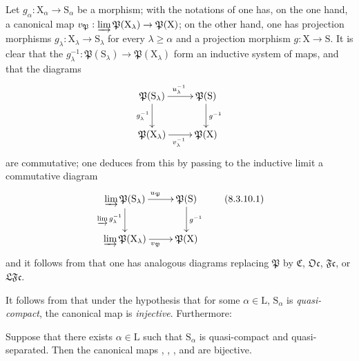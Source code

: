 \begin{env}[8.3.10]
\label{IV.8.3.10}
Let $g_\alpha:\mathrm{X}_\alpha\to\mathrm{S}_\alpha$ be a morphism; with the notations of  one has, on the one hand, a canonical map $v_\mathfrak{P}:\varinjlim\mathfrak{P}(\mathrm{X}_\lambda)\to\mathfrak{P}(\mathrm{X})$; on the other hand, one has projection morphisms $g_\lambda:\mathrm{X}_\lambda\to\mathrm{S}_\lambda$ for every $\lambda\geqslant\alpha$ and a projection morphism $g:\mathrm{X}\to\mathrm{S}$.
It is clear that the $g_\lambda^{-1}:\mathfrak{P}(\mathrm{S}_\lambda)\to\mathfrak{P}(\mathrm{X}_\lambda)$ form an inductive system of maps, and that the diagrams
\[
\xymatrix{
  \mathfrak{P}(\mathrm{S}_\lambda) \ar[r]^{u_\lambda^{-1}} \ar[d]_{g_\lambda^{-1}} & \mathfrak{P}(\mathrm{S}) \ar[d]^{g^{-1}} \\
  \mathfrak{P}(\mathrm{X}_\lambda) \ar[r]_{v_\lambda^{-1}} & \mathfrak{P}(\mathrm{X})
}
\]
are commutative; one deduces from this by passing to the inductive limit a commutative diagram
\begin{equation}
\xymatrix{
  \varinjlim\mathfrak{P}(\mathrm{S}_\lambda) \ar[r]^{u_\mathfrak{P}} \ar[d]_{\varinjlim g_\lambda^{-1}} & \mathfrak{P}(\mathrm{S}) \ar[d]^{g^{-1}} \\
  \varinjlim\mathfrak{P}(\mathrm{X}_\lambda) \ar[r]_{v_\mathfrak{P}} & \mathfrak{P}(\mathrm{X})
}
\tag{8.3.10.1}
\label{IV.8.3.10.1}
\end{equation}
and it follows from  that one has analogous diagrams replacing $\mathfrak{P}$ by $\mathfrak{C}$, $\mathfrak{Oc}$, $\mathfrak{Fc}$, or $\mathfrak{LFc}$.
\end{env}

It follows from  that under the hypothesis that for some $\alpha\in\mathrm{L}$, $\mathrm{S}_\alpha$ is \emph{quasi-compact}, the canonical map  is \emph{injective}.
Furthermore:

\begin{theorem}[8.3.11]
\label{IV.8.3.11}
Suppose that there exists $\alpha\in\mathrm{L}$ such that $\mathrm{S}_\alpha$ is quasi-compact and quasi-separated.
Then the canonical maps , , , and  are bijective.
\end{theorem}

